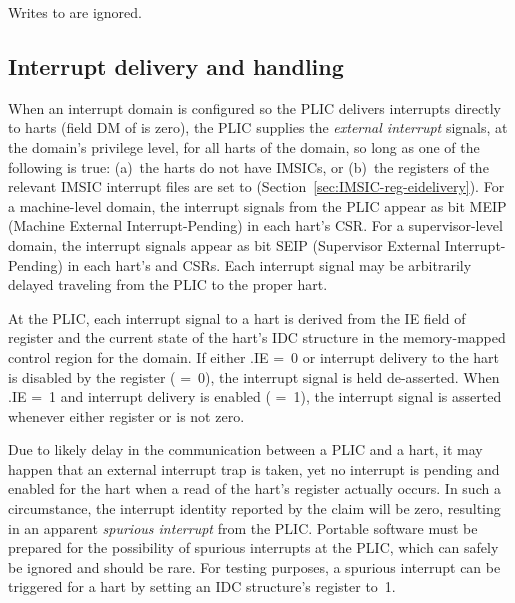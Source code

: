 Writes to  are ignored.

\subsection{Interrupt delivery and handling}
\label{sec:AdvPLIC-directMode-intrDelivery}

When an interrupt domain is configured so the PLIC delivers interrupts
directly to harts (field DM of  is zero), the PLIC
supplies the \emph{external interrupt} signals, at the domain's
privilege level, for all harts of the domain, so long as one of the
following is true:
(a)~the harts do not have IMSICs, or
(b)~the  registers of the relevant IMSIC interrupt files
are set to  (Section~\ref{sec:IMSIC-reg-eidelivery}).
For a machine-level domain, the interrupt signals from the PLIC appear
as bit MEIP (Machine External Interrupt-Pending) in each hart's 
CSR.
For a supervisor-level domain, the interrupt signals appear as bit
SEIP (Supervisor External Interrupt-Pending) in each hart's  and
 CSRs.
Each interrupt signal may be arbitrarily delayed traveling from the
PLIC to the proper hart.

At the PLIC, each interrupt signal to a hart is derived from the IE
field of register  and the current state of the hart's IDC
structure in the memory-mapped control region for the domain.
If either .IE =~0 or interrupt delivery to the hart
is disabled by the  register ( =~0), the
interrupt signal is held de-asserted.
When .IE =~1 and interrupt delivery is enabled
( =~1), the interrupt signal is asserted whenever either
register  or  is not zero.

Due to likely delay in the communication between a PLIC and a hart, it
may happen that an external interrupt trap is taken, yet no interrupt
is pending and enabled for the hart when a read of the hart's
 register actually occurs.
In such a circumstance, the interrupt identity reported by the claim
will be zero, resulting in an apparent \emph{spurious interrupt} from
the PLIC.
Portable software must be prepared for the possibility of spurious
interrupts at the PLIC, which can safely be ignored and should be rare.
For testing purposes, a spurious interrupt can be triggered for a hart
by setting an IDC structure's  register to~1.

